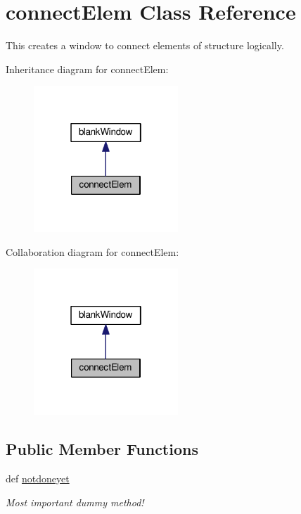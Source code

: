 \hypertarget{classgui_1_1window3a_1_1connectElem}{\section{connect\-Elem Class Reference}
\label{classgui_1_1window3a_1_1connectElem}
}


This creates a window to connect elements of structure logically.  




Inheritance diagram for connect\-Elem\-:\nopagebreak
\begin{figure}[H]
\begin{center}
\leavevmode
\includegraphics[width=154pt]{classgui_1_1window3a_1_1connectElem__inherit__graph}
\end{center}
\end{figure}


Collaboration diagram for connect\-Elem\-:\nopagebreak
\begin{figure}[H]
\begin{center}
\leavevmode
\includegraphics[width=154pt]{classgui_1_1window3a_1_1connectElem__coll__graph}
\end{center}
\end{figure}
\subsection*{Public Member Functions}
\begin{DoxyCompactItemize}
\item 
\hypertarget{classgui_1_1window3a_1_1connectElem_a615f3073891733337c33f599f89ec7ef}{def \hyperlink{classgui_1_1window3a_1_1connectElem_a615f3073891733337c33f599f89ec7ef}{notdoneyet}}\label{classgui_1_1window3a_1_1connectElem_a615f3073891733337c33f599f89ec7ef}

\begin{DoxyCompactList}\small\item\em Most important dummy method! \end{DoxyCompactList}\end{DoxyCompactItemize}


